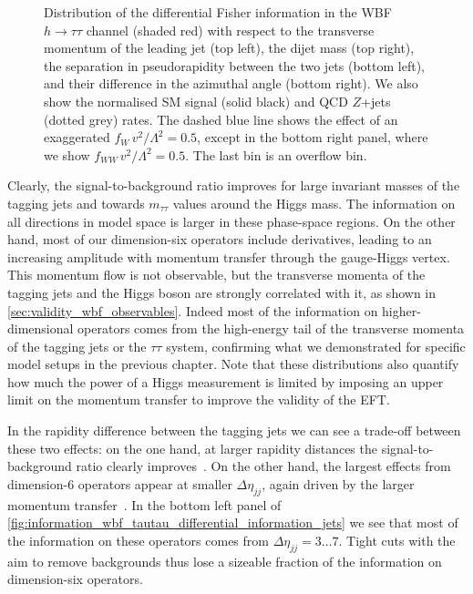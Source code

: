 \begin{figure}
  \caption{Distribution of the differential Fisher information in the
    WBF $h \to \tau \tau$ channel (shaded red) with respect to the
    transverse momentum of the leading jet (top left), the dijet mass
    (top right), the separation in pseudorapidity between the two jets
    (bottom left), and their difference in the azimuthal angle (bottom
    right). We also show the normalised SM signal (solid black) and
    QCD $Z$+jets (dotted grey) rates. The dashed blue line shows the
    effect of an exaggerated $f_{W} \, v^2 / \Lambda^2 = 0.5$, except
    in the bottom right panel, where we show
    $f_{WW} \, v^2 / \Lambda^2 = 0.5$. The last bin is an overflow
    bin.}
  \label{fig:information_wbf_tautau_differential_information_jets}
\end{figure}

Clearly, the signal-to-background ratio improves for large invariant
masses of the tagging jets and towards $m_{\tau \tau}$ values around
the Higgs mass. The information on all directions in model space is
larger in these phase-space regions. On the other hand, most of our
dimension-six operators include derivatives, leading to an increasing
amplitude with momentum transfer through the gauge-Higgs vertex. This
momentum flow is not observable, but the transverse momenta of the
tagging jets and the Higgs boson are strongly correlated with it, as
shown in \autoref{sec:validity_wbf_observables}. Indeed most of the
information on higher-dimensional operators comes from the high-energy
tail of the transverse momenta of the tagging jets or the $\tau \tau$
system, confirming what we demonstrated for specific model setups in
the previous chapter. Note that these distributions also quantify how
much the power of a Higgs measurement is limited by imposing an upper
limit on the momentum transfer to improve the validity of the EFT.

In the rapidity difference between the tagging jets we can see a
trade-off between these two effects: on the one hand, at larger
rapidity distances the signal-to-background ratio clearly
improves~\cite{Kleiss:1987cj, Baur:1990xe, Barger:1991ib,
  Rainwater:1996ud, Rainwater:1998kj, Cox:2010ug, Gerwick:2011tm}. On
the other hand, the largest effects from dimension-6 operators appear
at smaller $\Delta \eta_{jj}$, again driven by the larger momentum
transfer~\cite{Biekotter:2016ecg}. In the bottom left panel of
\autoref{fig:information_wbf_tautau_differential_information_jets} we
see that most of the information on these operators comes from
$\Delta \eta_{jj} = 3\dots7$. Tight cuts with the aim to remove
backgrounds thus lose a sizeable fraction of the information on
dimension-six operators.

